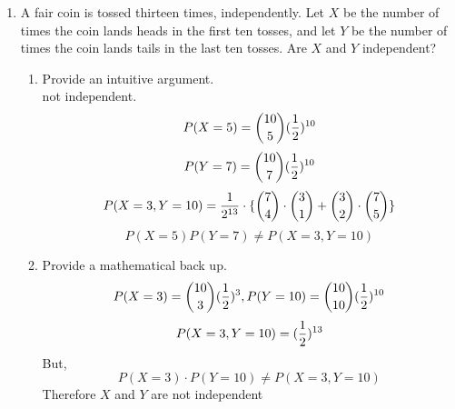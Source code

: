 \documentclass[12pt]{article}%
\newcommand{\0}{{\bf 0}}
\begin{document}
\begin{enumerate}
\item
A fair coin is tossed thirteen times, independently. Let $X$ be the number of times the coin lands heads in the first ten tosses, and let $Y$ be the number of times the coin lands tails in the last ten tosses.
Are $X$ and $Y$ independent?
\begin{enumerate}
\item Provide an intuitive argument.
\\
{\color{blue}{\bf Sol.}}
not independent.
$$P(X=5)={10 \choose 5}(\frac{1}{2})^{10}$$
$$P(Y=7)={10 \choose 7}(\frac{1}{2})^{10}$$
$$P(X=3,Y=10)=\frac{1}{2^{13}}\cdot\{{7 \choose 4}\cdot{3 \choose 1}+{3 \choose 2}\cdot{7 \choose 5} \}$$
$$P(X=5)P(Y=7) \neq P(X=3,Y=10)$$
\item Provide a mathematical back up.
\\
{\color{blue}{\bf Sol.}}
$$P(X=3)={10 \choose 3}(\frac{1}{2})^{3}, P(Y=10)={10 \choose 10}(\frac{1}{2})^{10}$$
$$P(X=3,Y=10)=(\frac{1}{2})^{13}$$
But,
$$P(X=3)\cdot  P(Y=10) \neq P(X=3,Y=10)$$
Therefore $X$ and $Y$ are not independent
\end{enumerate}








\end{enumerate}
\end{document}
